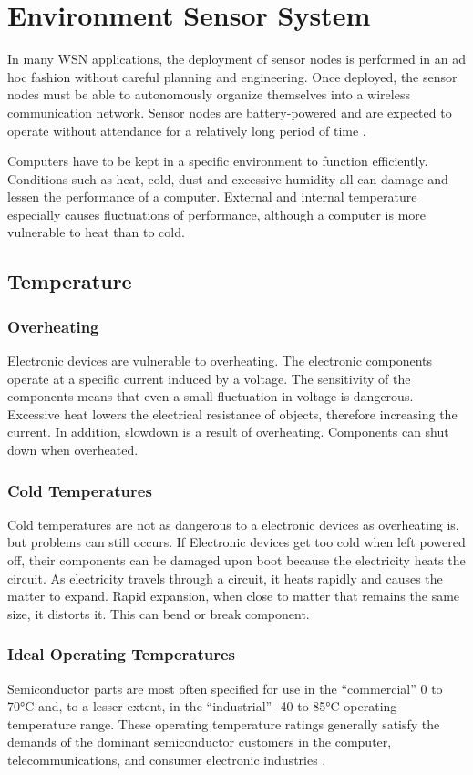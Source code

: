 \documentclass[conference]{IEEEtran}
\begin{document}
\section{Environment Sensor System}
In many WSN applications, the deployment of sensor nodes is performed in an ad hoc fashion without careful planning and engineering. Once deployed, the sensor nodes must be able to autonomously organize themselves into a wireless communication network. Sensor nodes are battery-powered and are expected to operate without attendance for a relatively long period of time \cite{Shio2010}.

Computers have to be kept in a specific environment to function efficiently. Conditions such as heat, cold, dust and excessive humidity all can damage and lessen the performance of a computer. External and internal temperature especially causes fluctuations of performance, although a computer is more vulnerable to heat than to cold.

\subsection{Temperature}
\subsubsection{Overheating}
Electronic devices are vulnerable to overheating. The electronic components operate at a specific current induced by a voltage. The sensitivity of the components means that even a small fluctuation in voltage is dangerous. Excessive heat lowers the electrical resistance of objects, therefore increasing the current. In addition, slowdown is a result of overheating. Components can shut down when overheated.

\subsubsection{Cold Temperatures}
Cold temperatures are not as dangerous to a electronic devices as overheating is, but problems can still occurs. If Electronic devices get too cold when left powered off, their components can be damaged upon boot because the electricity heats the circuit. As electricity travels through a circuit, it heats rapidly and causes the matter to expand. Rapid expansion, when close to matter that remains the same size, it distorts it. This can bend or break component.

\subsubsection{Ideal Operating Temperatures}
Semiconductor parts are most often specified for use in the “commercial” 0 to 70°C and, to a lesser extent, in the “industrial” -40 to 85°C operating temperature range. These operating temperature ratings generally satisfy the demands of the dominant semiconductor customers in the computer, telecommunications, and consumer electronic industries \cite{Mishra2004}.
\end{document}
